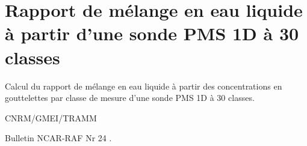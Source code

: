%
\section{Rapport de m\'elange en eau liquide \`a partir d'une sonde PMS
1D \`a 30 classes }

 

Calcul du rapport de m\'elange en eau liquide \`a partir des 
concentrations en gouttelettes par classe de mesure d'une
sonde PMS 1D \`a 30 classes.

\bigskip





CNRM/GMEI/TRAMM

Bulletin NCAR-RAF Nr 24 \cite{RAF-24}.
%
